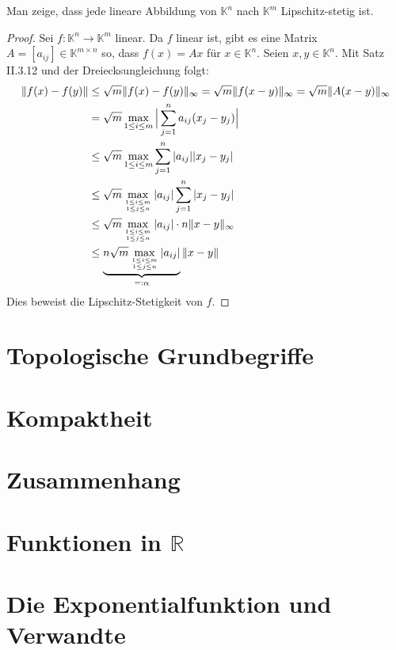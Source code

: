 
\begin{aufgabe}
	Man zeige, dass jede lineare Abbildung von $\mathbb K^n$ nach $\mathbb K^m$
	Lipschitz-stetig ist.
\end{aufgabe}
\begin{proof}
	Sei $f: \mathbb K^n \to \mathbb K^m$ linear. Da $f$ linear ist, gibt es eine
	Matrix $A = [a_{ij}] \in \mathbb K^{m \times n}$ so, dass $f(x) = A x$ für $x \in \mathbb K^n$.
	Seien $x, y \in \mathbb K^n$. Mit Satz II.3.12 und der Dreiecksungleichung folgt:
	\begin{align*}
		\Vert f(x) - f(y) \Vert
			&\leq \sqrt m \Vert f(x) - f(y) \Vert_\infty
			= \sqrt m \Vert f(x-y) \Vert_\infty 
			= \sqrt m \Vert A(x-y) \Vert_\infty \\
			&= \sqrt m \max_{1 \leq i \leq m} \Big \vert \sum_{j=1}^n a_{ij} (x_j - y_j) \Big \vert \\
			&\leq \sqrt m \max_{1 \leq i \leq m} \sum_{j=1}^n |a_{ij}| | x_j - y_j | \\
			&\leq \sqrt m \max_{1 \leq i \leq m \atop 1 \leq j \leq n} | a_{ij}| \sum_{j=1}^n |x_j - y_j| \\
			&\leq \sqrt m \max_{1 \leq i \leq m \atop 1 \leq j \leq n} |a_{ij}|\cdot  n \Vert x - y \Vert_\infty \\
			&\leq \underbrace{n \sqrt m \max_{1 \leq i \leq m \atop 1 \leq j \leq n} |a_{ij}| }_{=: \alpha} \Vert x -y \Vert
	\end{align*}
	Dies beweist die Lipschitz-Stetigkeit von $f$.
\end{proof}


\section{Topologische Grundbegriffe}
\section{Kompaktheit}
\section{Zusammenhang}
\section{Funktionen in $\mathbb R$}
\section{Die Exponentialfunktion und Verwandte}
